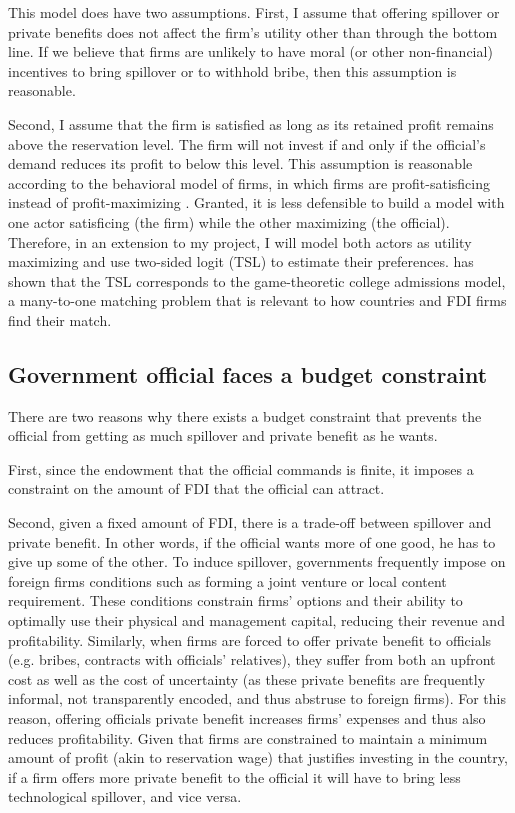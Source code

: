 This model does have two assumptions. First, I assume that offering spillover or private benefits does not affect the firm's utility other than through the bottom line. If we believe that firms are unlikely to have moral (or other non-financial) incentives to bring spillover or to withhold bribe, then this assumption is reasonable. 

Second, I assume that the firm is satisfied as long as its retained profit remains above the reservation level. The firm will not invest if and only if the official's demand reduces its profit to below this level. This assumption is reasonable according to the behavioral model of firms, in which firms are profit-satisficing instead of profit-maximizing \citep{Simon1959}. Granted, it is less defensible to build a model with one actor satisficing (the firm) while the other maximizing (the official). Therefore, in an extension to my project, I will model both actors as utility maximizing and use two-sided logit (TSL) to estimate their preferences. \citet{Logan1996a} has shown that the TSL corresponds to the game-theoretic college admissions model, a many-to-one matching problem that is relevant to how countries and FDI firms find their match.


\subsection{Government official faces a budget constraint}

There are two reasons why there exists a budget constraint that prevents the official from getting as much spillover and private benefit as he wants.

First, since the endowment that the official commands is finite, it imposes a constraint on the amount of FDI that the official can attract.

Second, given a fixed amount of FDI, there is a trade-off between spillover and private benefit. In other words, if the official wants more of one good, he has to give up some of the other. To induce spillover, governments frequently impose on foreign firms conditions such as forming a joint venture or local content requirement. These conditions constrain firms' options and their ability to optimally use their physical and management capital, reducing their revenue and profitability. Similarly, when firms are forced to offer private benefit to officials (e.g. bribes, contracts with officials' relatives), they suffer from both an upfront cost as well as the cost of uncertainty (as these private benefits are frequently informal, not transparently encoded, and thus abstruse to foreign firms). For this reason, offering officials private benefit increases firms' expenses and thus also reduces profitability. Given that firms are constrained to maintain a minimum amount of profit (akin to reservation wage) that justifies investing in the country, if a firm offers more private benefit to the official it will have to bring less technological spillover, and vice versa.

